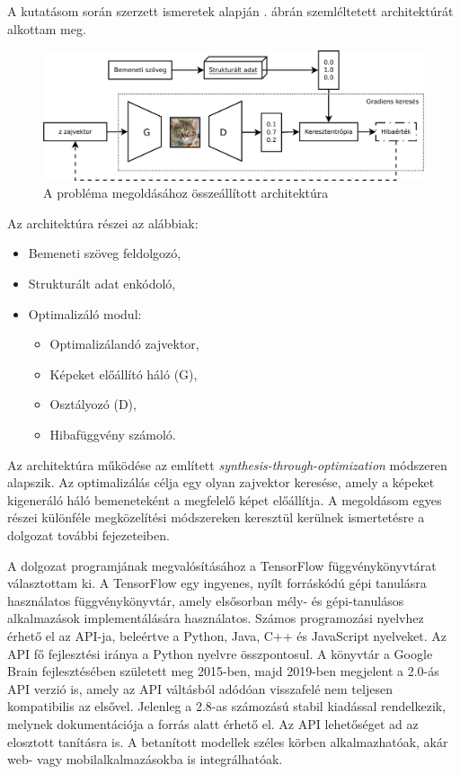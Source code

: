 
A kutatásom során szerzett ismeretek alapján . ábrán szemléltetett architektúrát alkottam meg.

\begin{figure}[h]
\centering
\includegraphics[width=15cm]{images/architecture.png}
\caption{A probléma megoldásához összeállított architektúra}
\label{fig:architecture}
\end{figure}

Az architektúra részei az alábbiak:

\begin{itemize}
	\item Bemeneti szöveg feldolgozó,
	\item Strukturált adat enkódoló,
	\item Optimalizáló modul:
		\begin{itemize}
			\item Optimalizálandó zajvektor,
			\item Képeket előállító háló (G),
			\item Osztályozó (D),
			\item Hibafüggvény számoló.
		\end{itemize}
\end{itemize}

Az architektúra működése az említett \textit{synthesis-through-optimization} módszeren alapszik. Az optimalizálás célja egy olyan zajvektor keresése, amely a képeket kigeneráló háló bemeneteként a megfelelő képet előállítja.
A megoldásom egyes részei különféle megközelítési módszereken keresztül kerülnek ismertetésre a dolgozat további fejezeteiben.


A dolgozat programjának megvalósításához a TensorFlow függvénykönyvtárat választottam ki. A TensorFlow egy ingyenes, nyílt forráskódú gépi tanulásra használatos függvénykönyvtár, amely elsősorban mély- és gépi-tanulásos alkalmazások implementálására használatos. Számos programozási nyelvhez érhető el az API-ja, beleértve a Python, Java, C++ és JavaScript nyelveket. Az API fő fejlesztési iránya a Python nyelvre összpontosul. A könyvtár a Google Brain fejlesztésében született meg 2015-ben, majd 2019-ben megjelent a 2.0-ás API verzió is, amely az API váltásból adódóan visszafelé nem teljesen kompatibilis az elsővel. Jelenleg a 2.8-as számozású stabil kiadással rendelkezik, melynek dokumentációja a \cite{tensorflow} forrás alatt érhető el. Az API lehetőséget ad az elosztott tanításra is. A betanított modellek széles körben alkalmazhatóak, akár web- vagy mobilalkalmazásokba is integrálhatóak. 

